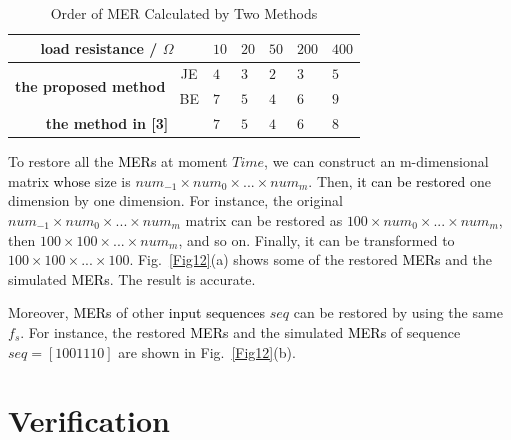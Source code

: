 \documentclass[conference]{IEEEtran}
\begin{document}
\begin{table}[t]
\caption{Order of MER Calculated by Two Methods}
\label{TabIV}
    \begin{center}
    \begin{tabular}{|p{2.62cm}|p{0.45cm}|p{0.45cm}|p{0.45cm}|p{0.45cm}|p{0.45cm}|p{0.45cm}|}\hline
        \multicolumn{2}{|c|}{\textbf{load resistance} / $\Omega$}
            & $10$ & $20$ & $50$ & $200$ & $400$ \\ \hline
        \multirow{2}{*}{\textbf{the proposed method}}&
            \multicolumn{1}{|c|}{JE}
             & $4$ & $3$ & $2$ & $3$ & $5$ \\ \cline{2-7}
        \multicolumn{1}{|c|}{}&
            \multicolumn{1}{|c|}{BE}
            & $7$ & $5$ & $4$ & $6$ & $9$ \\ \hline
        \multicolumn{2}{|c|}{\textbf{the method in [3]}}
            & $7$ & $5$ & $4$ & $6$ & $8$ \\ \hline
    \end{tabular}
    \end{center}
\end{table}

To restore all the \textcolor{black}{MERs} at moment $Time$, we can construct an m-dimensional matrix \textcolor{black}{whose} size is $num_{-1}\times num_0\times ...\times num_m$. Then, \textcolor{black}{it can be restored} one dimension by one dimension. For instance, the original $num_{-1}\times num_0\times ...\times num_m$ matrix can be restored as $100\times num_0\times ...\times num_m$, then $100\times 100\times ...\times num_m$, and so on. Finally, it can be transformed to $100\times 100\times ...\times 100$. Fig.~\ref{Fig12}(a) shows some of the restored \textcolor{black}{MERs} and the simulated \textcolor{black}{MERs}. The result is accurate.

Moreover, \textcolor{black}{MERs} of other \textcolor{black}{input sequences} $seq$ can be restored by using the same $f_s$. For instance, the restored \textcolor{black}{MERs} and the simulated \textcolor{black}{MERs} of sequence $seq=[1001110]$ are shown in Fig.~\ref{Fig12}(b).

\section{Verification}\label{V}
\end{document}
